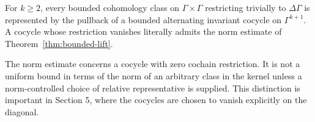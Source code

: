 \begin{corollary}\label{cor:bounded-diagonal}
For $k\geq2$, every bounded cohomology class on
$\Gamma\times\Gamma$ restricting trivially to
$\Delta\Gamma$ is represented by the pullback
of a bounded alternating invariant cocycle
on $\Gamma^{k+1}$. A cocycle whose restriction
vanishes literally admits the norm estimate
of Theorem~\ref{thm:bounded-lift}.
\end{corollary}

\begin{remark}
The norm estimate concerns a cocycle with zero
cochain restriction. It is not a uniform bound
in terms of the norm of an arbitrary class in
the kernel unless a norm-controlled choice of
relative representative is supplied.
This distinction is important in Section 5,
where the cocycles are chosen to vanish
explicitly on the diagonal.
\end{remark}
